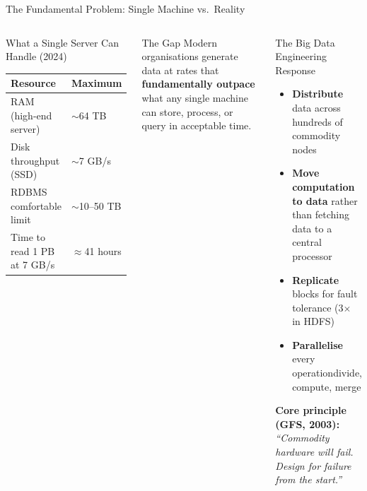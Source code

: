 \documentclass[aspectratio=169,10pt]{beamer}
\begin{document}
\begin{frame}{The Fundamental Problem: Single Machine vs.\ Reality}
  \begin{columns}[T]
      \begin{block}{What a Single Server Can Handle (2024)}
        \vspace{2pt}
        \renewcommand{\arraystretch}{1.2}
        \begin{tabular}{ll}
          \toprule
          \textbf{Resource} & \textbf{Maximum} \\
          \midrule
          RAM (high-end server)    & $\sim$64 TB \\
          Disk throughput (SSD)    & $\sim$7 GB/s \\
          RDBMS comfortable limit  & $\sim$10--50 TB \\
          Time to read 1 PB at 7 GB/s & $\approx$41 hours \\
          \bottomrule
        \end{tabular}
      \end{block}
      \vspace{6pt}
      \begin{alertblock}{The Gap}
        Modern organisations generate data at rates that \textbf{fundamentally outpace} what any single machine can store, process, or query in acceptable time.
      \end{alertblock}

      \begin{exampleblock}{The Big Data Engineering Response}
        \vspace{2pt}
        \begin{itemize}
          \item \textbf{Distribute} data across hundreds of commodity nodes
          \item \textbf{Move computation to data} rather than fetching data to a central processor
          \item \textbf{Replicate} blocks for fault tolerance (3$\times$ in HDFS)
          \item \textbf{Parallelise} every operation\textemdash divide, compute, merge
        \end{itemize}
        \vspace{4pt}
        \textbf{Core principle (GFS, 2003):}\\
        \textit{``Commodity hardware will fail.  Design for failure from the start.''}
      \end{exampleblock}
  \end{columns}
\end{frame}
\end{document}
